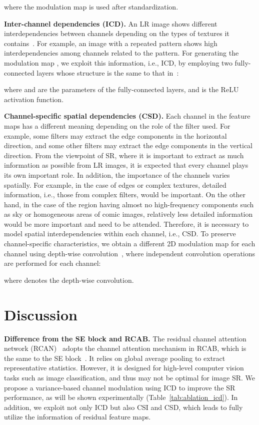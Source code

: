 \documentclass[final,5p,times,twocolumn]{elsarticle}
\begin{document}
where the modulation map is used after standardization.


\textbf{Inter-channel dependencies (ICD).}
An LR image shows different interdependencies between channels depending on the types of textures it contains~\cite{gatys2015texture}.
For example, an image with a repeated pattern shows high interdependencies among channels related to the pattern.
For generating the modulation map , we exploit this information, i.e., ICD, by employing two fully-connected layers whose structure is the same to that in~\cite{hu2018squeeze, hu2018channel}: 

where  and  are the parameters of the fully-connected layers, and  is the ReLU activation function.

\textbf{Channel-specific spatial dependencies (CSD).}
Each channel in the feature maps  has a different meaning depending on the role of the filter used.
For example, some filters may extract the edge components in the horizontal direction, and some other filters may extract the edge components in the vertical direction.
From the viewpoint of SR, where it is important to extract as much information as possible from LR images, it is expected that every channel plays its own important role.
In addition, the importance of the channels varies spatially.
For example, in the case of edges or complex textures, detailed information, i.e., those from complex filters, would be important.
On the other hand, in the case of the region having almost no high-frequency components such as sky or homogeneous areas of comic images, relatively less detailed information would be more important and need to be attended.
Therefore, it is necessary to model spatial interdependencies within each channel, i.e., CSD.
To preserve channel-specific characteristics, we obtain a different 2D modulation map for each channel using depth-wise convolution~\cite{howard2017mobilenets}, where independent convolution operations are performed for each channel:

where  denotes the  depth-wise convolution.







\section{Discussion}
\label{section:discussion}
\textbf{Difference from the SE block and RCAB.}
The residual channel attention network (RCAN)~\cite{zhang2018rcan} adopts the channel attention mechanism in RCAB, which is the same to the SE block~\cite{hu2018squeeze}. 
It relies on global average pooling to extract representative statistics. 
However, it is designed for high-level computer vision tasks such as image classification, and thus may not be optimal for image SR. 
We propose a variance-based channel modulation using ICD to improve the SR performance, as will be shown experimentally (Table~\ref{tab:ablation_icd}). 
In addition, we exploit not only ICD but also CSI and CSD, which leads to fully utilize the information of residual feature maps.
\end{document}
